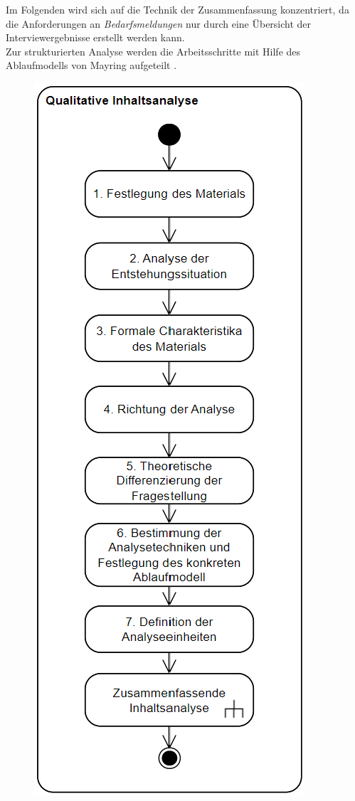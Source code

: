 Im Folgenden wird sich auf die Technik der Zusammenfassung konzentriert, da die Anforderungen an \emph{Bedarfsmeldungen} nur durch eine Übersicht der Interviewergebnisse erstellt werden kann.\\

Zur strukturierten Analyse werden die Arbeitsschritte mit Hilfe des Ablaufmodells von Mayring aufgeteilt \cite{mayring2019qualitative}.
\begin{figure}[H]
	\begin{minipage}[b]{.4\linewidth} %
		\includegraphics[scale=1.2]{Abbildungen/Ablaufmodell.png}

\end{minipage}
\end{figure}
